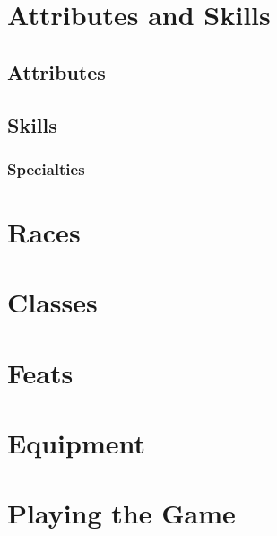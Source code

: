 \documentclass[10pt,twoside,openany]{book}
\begin{document}
\chapter{Attributes and Skills}
\begin{multicols}{2}

	\section{Attributes}

	\section{Skills}

		\subsection{Specialties}

\end{multicols}

\chapter{Races}
\begin{multicols}{2}


\end{multicols}

\chapter{Classes}
\begin{multicols}{2}


\end{multicols}

\chapter{Feats}
\begin{multicols}{2}


\end{multicols}

\chapter{Equipment}
\begin{multicols}{2}


\end{multicols}

\chapter{Playing the Game}
\begin{multicols}{2}


\end{multicols}
\end{document}
